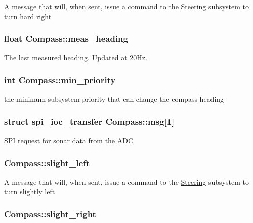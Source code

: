 A message that will, when sent, issue a command to the \hyperlink{classSteering}{Steering} subsystem to turn hard right \hypertarget{classCompass_af0f87a131e2c9833f7d52bed1a39bf75}{
\subsubsection[{meas\-\_\-heading}]{\setlength{\rightskip}{0pt plus 5cm}float Compass\-::meas\-\_\-heading\hspace{0.3cm}{\ttfamily [protected]}}}\label{classCompass_af0f87a131e2c9833f7d52bed1a39bf75}
The last measured heading. Updated at 20\-Hz. \hypertarget{classCompass_a90f2dea7249c85f22c5bc45ed9d86b57}{
\subsubsection[{min\-\_\-priority}]{\setlength{\rightskip}{0pt plus 5cm}int Compass\-::min\-\_\-priority\hspace{0.3cm}{\ttfamily [protected]}}}\label{classCompass_a90f2dea7249c85f22c5bc45ed9d86b57}
the minimum subsystem priority that can change the compass heading \hypertarget{classCompass_aed40464cb0c9203d87ab8a9127cc9080}{
\subsubsection[{msg}]{\setlength{\rightskip}{0pt plus 5cm}struct spi\-\_\-ioc\-\_\-transfer Compass\-::msg\mbox{[}1\mbox{]}\hspace{0.3cm}{\ttfamily [protected]}}}\label{classCompass_aed40464cb0c9203d87ab8a9127cc9080}
S\-P\-I request for sonar data from the \hyperlink{classADC}{A\-D\-C} \hypertarget{classCompass_a9e0a282c1253451fd7967646074102ee}{
\subsubsection[{slight\-\_\-left}]{ Compass\-::slight\-\_\-left}}\label{classCompass_a9e0a282c1253451fd7967646074102ee}
A message that will, when sent, issue a command to the \hyperlink{classSteering}{Steering} subsystem to turn slightly left \hypertarget{classCompass_a9e9ff6610d60e6fd915984a3f3e40e13}{
\subsubsection[{slight\-\_\-right}]{ Compass\-::slight\-\_\-right}}\label{classCompass_a9e9ff6610d60e6fd915984a3f3e40e13}
